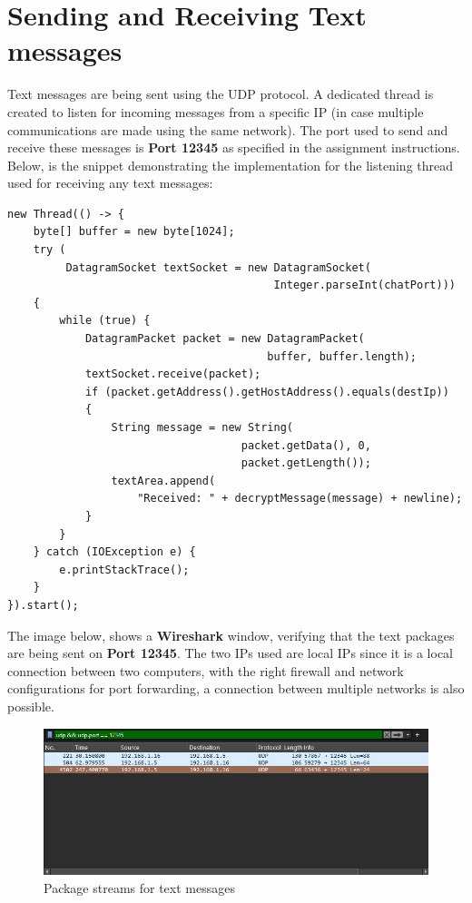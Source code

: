 \documentclass[12pt]{report}
\begin{document}
\section{Sending and Receiving Text messages}
Text messages are being sent using the UDP protocol. A dedicated thread is created to listen for incoming messages from a specific IP (in case multiple communications are made using the same network). The port used to send and receive these messages is \textbf{Port 12345} as specified in the assignment instructions. \\
Below, is the snippet demonstrating the implementation for the listening thread used for receiving any text messages:
\begin{lstlisting}[style=javastyle]
new Thread(() -> {
	byte[] buffer = new byte[1024];
	try (
         DatagramSocket textSocket = new DatagramSocket(
                                         Integer.parseInt(chatPort)))
    {
		while (true) {
			DatagramPacket packet = new DatagramPacket(
                                        buffer, buffer.length);
			textSocket.receive(packet);
			if (packet.getAddress().getHostAddress().equals(destIp))
            {
				String message = new String(
                                    packet.getData(), 0, 
                                    packet.getLength());
				textArea.append(
                    "Received: " + decryptMessage(message) + newline);
			}
		}
	} catch (IOException e) {
		e.printStackTrace();
	}
}).start();
\end{lstlisting}
\vfill
The image below, shows a \textbf{Wireshark} window, verifying that the text packages are being sent on \textbf{Port 12345}. The two IPs used are local IPs since it is a local connection between two computers, with the right firewall and network configurations for port forwarding, a connection between multiple networks is also possible.
\begin{figure}[h!]
    \centering
    \includegraphics[width=1\linewidth]{Screenshot 2024-12-12 112931.png}
    \caption{Package streams for text messages}
    \label{fig:enter-label}
\end{figure}
\end{document}
